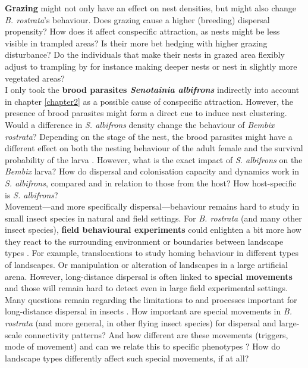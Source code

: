 \documentclass[10pt, twoside]{book} %
\begin{document}
	\textbf{Grazing} might not only have an effect on nest densities, but might also change \textit{B. rostrata}'s behaviour. Does grazing cause a higher (breeding) dispersal propensity? How does it affect conspecific attraction, as nests might be less visible in trampled areas? Is their more bet hedging with higher grazing disturbance? Do the individuals that make their nests in grazed area flexibly adjust to trampling by for instance making deeper nests or nest in slightly more vegetated areas?\\
	
	I only took the \textbf{brood parasites \textit{Senotainia albifrons}} indirectly into account in chapter \ref{chapter2} as a possible cause of conspecific attraction. However, the presence of brood parasites might form a direct cue to induce nest clustering. Would a difference in \textit{S. albifrons} density change the behaviour of \textit{Bembix rostrata}? Depending on the stage of the nest, the brood parasites might have a different effect on both the nesting behaviour of the adult female and the survival probability of the larva \citep{evans1957, polidori2009a}. However, what is the exact impact of \textit{S. albifrons} on the \textit{Bembix} larva? How do dispersal and colonisation capacity and dynamics work in \textit{S. albifrons}, compared and in relation to those from the host? How host-specific is \textit{S. albifrons}?\\
	
	Movement---and more specifically dispersal---behaviour remains hard to study in small insect species in natural and field settings. For \textit{B. rostrata} (and many other insect species), \textbf{field behavioural experiments} could enlighten a bit more how they react to the surrounding environment or boundaries between landscape types \citep[i.e. behavioural landscape ecology experiments;][]{knowlton2010}. For example, translocations to study homing behaviour \citep{tengo1990, schone1991} in different types of landscapes. Or manipulation or alteration of landscapes in a large artificial arena. However, long-distance dispersal is often linked to \textbf{special movements} \citep{vandyck2005} and those will remain hard to detect even in large field experimental settings. Many questions remain regarding the limitations to and processes important for long-distance dispersal in insects \citep{leitch2021}. How important are special movements in \textit{B. rostrata} (and more general, in other flying insect species) for dispersal and large-scale connectivity patterns? And how different are these movements (triggers, mode of movement) and can we relate this to specific phenotypes \citep[i.e. dispersal syndromes; larger, better flyers, metabolic differences;][]{stevens2013}? How do landscape types differently affect such special movements, if at all?\\
	
\end{document}
